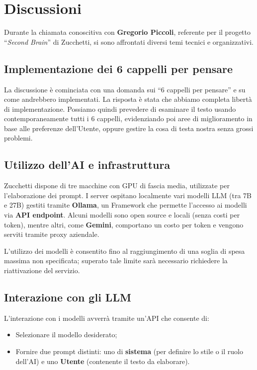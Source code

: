 \documentclass[a4paper,12pt]{article}
\begin{document}
\section{Discussioni}

Durante la chiamata conoscitiva con \textbf{Gregorio Piccoli}, referente per il progetto “\textit{Second Brain}” di Zucchetti, si sono affrontati diversi temi tecnici e organizzativi.

\subsection{Implementazione dei 6 cappelli per pensare}
La discussione è cominciata con una domanda sui “6 cappelli per pensare” e su come andrebbero implementati. La risposta è stata che abbiamo completa libertà di implementazione. Possiamo quindi prevedere di esaminare il testo usando contemporaneamente tutti i 6 cappelli, evidenziando poi aree di miglioramento in base alle preferenze dell’Utente, oppure gestire la cosa di testa nostra senza grossi problemi.

\subsection{Utilizzo dell'AI e infrastruttura}
Zucchetti dispone di tre macchine con GPU di fascia media, utilizzate per l’elaborazione dei prompt.
I server ospitano localmente vari modelli LLM (tra 7B e 27B) gestiti tramite \textbf{Ollama}, un Framework che permette l’accesso ai modelli via \textbf{API endpoint}.
Alcuni modelli sono open source e locali (senza costi per token), mentre altri, come \textbf{Gemini}, comportano un costo per token e vengono serviti tramite proxy aziendale.

L’utilizzo dei modelli è consentito fino al raggiungimento di una soglia di spesa massima non specificata; superato tale limite sarà necessario richiedere la riattivazione del servizio.

\subsection{Interazione con gli LLM}
L’interazione con i modelli avverrà tramite un’API che consente di:
\begin{itemize}
    \item Selezionare il modello desiderato;
    \item Fornire due prompt distinti: uno di \textbf{sistema} (per definire lo stile o il ruolo dell’AI) e uno \textbf{Utente} (contenente il testo da elaborare).
\end{itemize}
\end{document}
